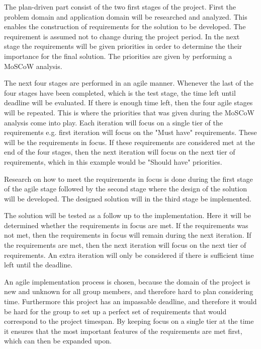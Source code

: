 The plan-driven part consist of the two first stages of the project. First the problem domain and application domain will be researched and analyzed. This enables the construction of requirements for the solution to be developed. The requirement is assumed not to change during the project period. In the next stage the requirements will be given priorities in order to determine the their importance for the final solution. The priorities are given by performing a MoSCoW analysis.

The next four stages are performed in an agile manner. Whenever the last of the four stages have been completed, which is the test stage, the time left until deadline will be evaluated. If there is enough time left, then the four agile stages will be repeated. This is where the priorities that was given during the MoSCoW analysis come into play. Each iteration will focus on a single tier of the requirements e.g. first iteration will focus on the "Must have" requirements. These will be the requirements in focus. If these requirements are considered met at the end of the four stages, then the next iteration will focus on the next tier of requirements, which in this example would be "Should have" priorities.

Research on how to meet the requirements in focus is done during the first stage of the agile stage followed by the second stage where the design of the solution will be developed. The designed solution will in the third stage be implemented.

The solution will be tested as a follow up to the implementation. Here it will be determined whether the requirements in focus are met. If the requirements was not met, then the requirements in focus will remain during the next iteration. If the requirements are met, then the next iteration will focus on the next tier of requirements. An extra iteration will only be considered if there is sufficient time left until the deadline.

An agile implementation process is chosen, because the domain of the project is new and unknown for all group members, and therefore hard to plan considering time. Furthermore this project has an impassable deadline, and therefore it would be hard for the group to set up a perfect set of requirements that would correspond to the project timespan. By keeping focus on a single tier at the time it ensures that the most important features of the requirements are met first, which can then be expanded upon.

































